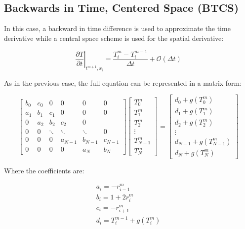 \subsection{Backwards in Time, Centered Space (BTCS)}

In this case, a backward in time difference is used to approximate the time derivative while a central space scheme is used for the spatial derivative: 

\begin{equation}
    \left. \frac{\partial T}{\partial t} \right|_{t^{m+1},x_i} = \frac{T^m_i - T^{m-1}_i}{\Delta t}+\mathcal{O}(\Delta t)
\end{equation}

As in the previous case, the full equation can be represented in a matrix form: 

$$
\begin{bmatrix}
         b_0 & c_0 & 0 & 0 & 0 & 0 \\
         a_1 & b_1 & c_1 & 0 & 0 & 0 \\ 
         0 & a_2 & b_2 & c_2 & 0 \\ 
         0 & 0 & \ddots & \ddots & \ddots & 0 \\
         0 & 0 & 0 & a_{N-1} & b_{N-1} & c_{N-1} \\
         0 & 0 & 0 & 0 & a_N & b_N 
     \end{bmatrix}
\begin{bmatrix}
         T^m_0  \\
         T^m_1 \\ 
         T^m_2  \\ 
         \vdots \\
         T^m_{N-1} \\
         T^m_N 
     \end{bmatrix}
     =
     \begin{bmatrix}
         d_0 + g(T^m_0) \\
         d_1 + g(T^m_1)\\ 
         d_2 + g(T^m_2)\\ 
         \vdots\\ 
         d_{N-1} + g(T^m_{N-1})\\
         d_{N} + g(T^m_{N}) 
     \end{bmatrix}
$$

Where the coefficients are:

\begin{equation}
    \begin{gathered}
        a_i = -r^m_{i-1} \\
    b_i = 1 + 2r^m_{i}\\
    c_i = - r^m_{i+1} \\
    d_i = T^{m-1}_i + g(T_i^m)
    \end{gathered}
\end{equation}


